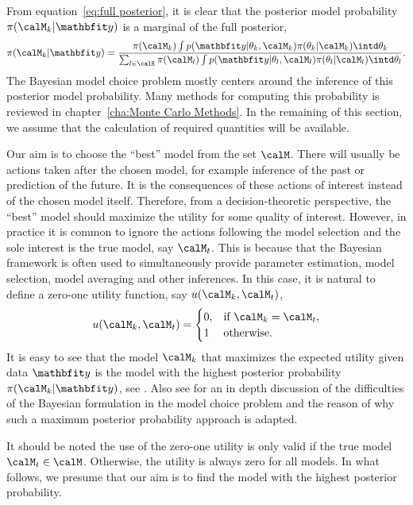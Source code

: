 From equation~\eqref{eq:full posterior}, it is clear that the posterior model
probability $\pi(\calM_k|\data)$ is a marginal of the full posterior,
\begin{equation}
  \pi(\calM_k|\data) =
  \frac{
    \pi(\calM_k)
    \int p(\data|\theta_k,\calM_k)\pi(\theta_k|\calM_k)\intd\theta_k
  }{
    \sum_{l\in\calK}\pi(\calM_l)
    \int p(\data|\theta_l,\calM_l)\pi(\theta_l|\calM_l)\intd\theta_l
  }.
  \label{eq:post model prob}
\end{equation}
The Bayesian model choice problem mostly centers around the inference of this
posterior model probability. Many methods for computing this probability is
reviewed in chapter~\ref{cha:Monte Carlo Methods}. In the remaining of this
section, we assume that the calculation of required quantities will be
available.

Our aim is to choose the ``best'' model from the set $\calM$. There will
usually be actions taken after the chosen model, for example inference of the
past or prediction of the future. It is the consequences of these actions of
interest instead of the chosen model itself. Therefore, from a
decision-theoretic perspective, the ``best'' model should maximize the utility
for some quality of interest. However, in practice it is common to ignore the
actions following the model selection and the sole interest is the true model,
say $\calM_t$. This is because that the Bayesian framework is often used to
simultaneously provide parameter estimation, model selection, model averaging
and other inferences. In this case, it is natural to define a zero-one utility
function, say $u(\calM_k,\calM_t)$,
\begin{equation}
  u(\calM_k,\calM_t) =
  \begin{cases}
    0, &\text{if } \calM_k = \calM_t,\\
    1  &\text{otherwise.}
  \end{cases}
\end{equation}
It is easy to see that the model $\calM_k$ that maximizes the expected utility
given data $\data$ is the model with the highest posterior probability
$\pi(\calM_k|\data)$, see \cite[][chap.~6]{Bernardo:1994vd}. Also see
\cite[][sec.~7.2.1]{Robert:2007tc} for an in depth discussion of the
difficulties of the Bayesian formulation in the model choice problem and the
reason of why such a maximum posterior probability approach is adapted.

It should be noted the use of the zero-one utility is only valid if the true
model $\calM_t \in \calM$. Otherwise, the utility is always zero for all
models. In what follows, we presume that our aim is to find the model with the
highest posterior probability.

